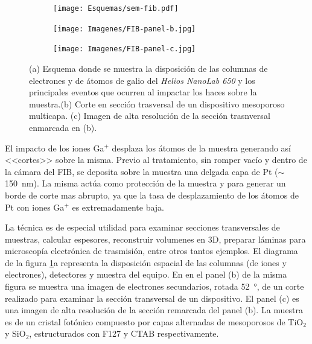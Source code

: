 		\begin{figure}[b!]
			  		  \begin{subfigure}[t]{\textwidth}
			  		  \centering\texttt{[image: Esquemas/sem-fib.pdf]}
			  		  \end{subfigure}
			  		  \begin{subfigure}[t]{0.498\textwidth}
			  		  \texttt{[image: Imagenes/FIB-panel-b.jpg]}
			  		  \end{subfigure}
			  		  \begin{subfigure}[t]{0.498\textwidth}
			  		  \texttt{[image: Imagenes/FIB-panel-c.jpg]}
			  		  \end{subfigure}
			  		  \caption[Esquema de las microscopias FIB/SEM]{(a) Esquema donde se muestra la disposición de las columnas de electrones y de átomos de galio del \textit{Helios NanoLab 650} y los principales eventos que ocurren al impactar los haces sobre la muestra.(b) Corte en sección trasversal de un dispositivo mesoporoso multicapa. (c) Imagen de alta resolución de la sección trasnversal enmarcada en (b).}
			  		  \label{esq:sem-fib}
			  		  \end{figure}

		El impacto de los iones Ga${^+}$ desplaza los átomos de la muestra generando así <<cortes>> sobre la misma. Previo al tratamiento, sin romper vacío y dentro de la cámara del FIB, se deposita sobre la muestra una delgada capa de Pt ($\sim$\SI{150}{\nm}). La misma actúa como protección de la muestra y para generar un borde de corte mas abrupto, ya que la tasa de desplazamiento de los átomos de Pt con iones Ga${^+}$ es extremadamente baja.\cite{Giannuzzi2005,Orloff1996} 

			

		La técnica es de especial utilidad para examinar secciones transversales de muestras, calcular espesores, reconstruir volumenes en 3D, preparar láminas para microscopía electrónica de trasmisión, entre otros tantos ejemplos. El diagrama de la figura \ref{esq:sem-fib}a representa la disposición espacial de las columnas (de iones y electrones), detectores y muestra del equipo. En en el panel (b) de la misma figura se muestra una imagen de electrones secundarios, rotada \SI{52}{\degree}, de un corte realizado para examinar la sección transversal de un dispositivo. El panel (c) es una imagen de alta resolución de la sección remarcada del panel (b). La muestra es de un cristal fotónico compuesto por capas alternadas de mesoporosos de TiO$_2$ y SiO$_2$, estructurados con F127 y CTAB respectivamente.\cite{Gimenez2017}

